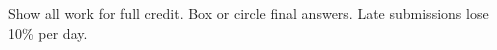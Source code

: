 %
%
Show all work for full credit. Box or circle final answers. Late submissions
lose 10\% per day.
